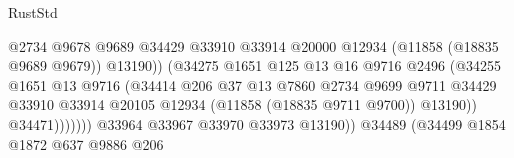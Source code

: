 \begin{lexlean}{RustStd}
\begin{coremodule}
                                                  @2734
                                                  @9678
                                                  @9689
                                                  @34429
                                                  @33910
                                                  @33914
                                                  @20000
                                                  @12934
                                                  (@11858 (@18835 @9689 @9679))
                                                  @13190))
                                              (@34275
                                                @1651
                                                @125
                                                @13
                                                @16
                                                @9716
                                                @2496
                                                (@34255
                                                  @1651
                                                  @13
                                                  @9716
                                                  (@34414
                                                    @206
                                                    @37
                                                    @13
                                                    @7860
                                                    @2734
                                                    @9699
                                                    @9711
                                                    @34429
                                                    @33910
                                                    @33914
                                                    @20105
                                                    @12934
                                                    (@11858 (@18835 @9711 @9700))
                                                    @13190))
                                                @34471)))))))
                                  @33964
                                  @33967
                                  @33970
                                  @33973
                                  @13190))
                              @34489
                              (@34499
                                @1854
                                @1872
                                @637
                                @9886
                                @206

\end{coremodule}
\end{lexlean}
